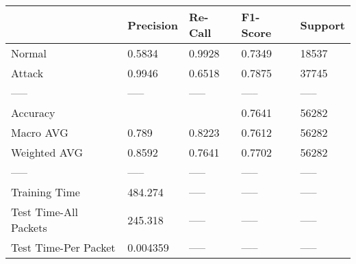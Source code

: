 \begin{tabular}{lllll}
\toprule
{} & Precision & Re-Call & F1-Score & Support \\
\midrule
Normal                &    0.5834 &  0.9928 &   0.7349 &   18537 \\
Attack                &    0.9946 &  0.6518 &   0.7875 &   37745 \\
-----                 &     ----- &   ----- &    ----- &   ----- \\
Accuracy              &           &         &   0.7641 &   56282 \\
Macro AVG             &     0.789 &  0.8223 &   0.7612 &   56282 \\
Weighted AVG          &    0.8592 &  0.7641 &   0.7702 &   56282 \\
-----                 &     ----- &   ----- &    ----- &   ----- \\
Training Time         &   484.274 &   ----- &    ----- &   ----- \\
Test Time-All Packets &   245.318 &   ----- &    ----- &   ----- \\
Test Time-Per Packet  &  0.004359 &   ----- &    ----- &   ----- \\
\bottomrule
\end{tabular}
